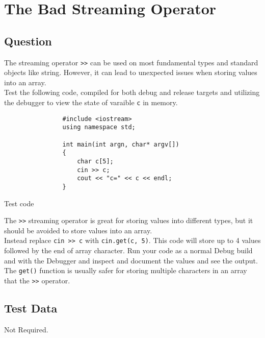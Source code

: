 \section{The Bad Streaming Operator}
    \subsection*{Question}
        The streaming operator \texttt{>>} can be used on most fundamental types and standard objects like string. However, 
        it can lead to unexpected issues when storing values into an array.\\

        Test the following code, compiled for both debug and release targets and 
        utilizing the debugger to view the state of varaible \texttt{c} in memory. \\
    
        \begin{listing}[H]
            \begin{verbatim}
                #include <iostream>
                using namespace std;

                int main(int argn, char* argv[])
                {
                    char c[5];
                    cin >> c;
                    cout << "c=" << c << endl;
                }
            \end{verbatim}
            \caption{Test code}
        \end{listing}

        The \texttt{>>} streaming operator is great for storing values into different types, 
        but it should be avoided to store values into an array.\\

        Instead replace \texttt{cin >> c} with \texttt{cin.get(c, 5)}.
        This code will store up to 4 values followed by the end of array character. 
        Run your code as a normal Debug build and with the Debugger and inspect and document the values and see the output. 
        The \texttt{get()} function is usually safer for storing multiple characters in an array that the \texttt{>>} operator.
            
    \subsection*{Test Data}
        Not Required.
        
